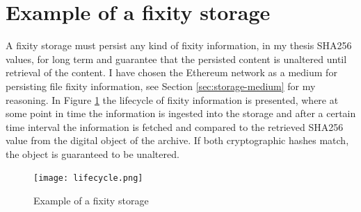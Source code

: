 \documentclass[final]{vutinfth}
\begin{document}
\section{Example of a fixity storage}
A fixity storage must persist any kind of fixity information, in my thesis SHA256 values, for long term and guarantee that the persisted content is unaltered until retrieval of the content. I have chosen the Ethereum network as a medium for persisting file fixity information, see Section \ref{sec:storage-medium} for my reasoning. In Figure \ref{fig:lifecycle} the lifecycle of fixity information is presented, where at some point in time the information is ingested into the storage and after a certain time interval the information is fetched and compared to the retrieved SHA256 value from the digital object of the archive. If both cryptographic hashes match, the object is guaranteed to be unaltered. 
\begin{figure}[t]
  \centering
  \texttt{[image: lifecycle.png]}
  \caption{Example of a fixity storage}
  \label{fig:lifecycle}
\end{figure}
\end{document}
